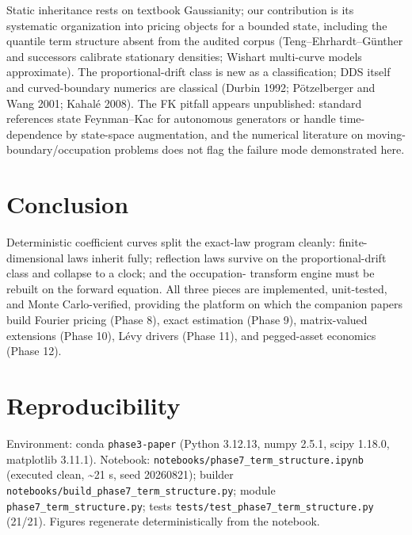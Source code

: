 \documentclass[
  english,
  10pt,
  letterpaper,
  DIV=11,
  numbers=noendperiod]{scrartcl}
\begin{document}
Static inheritance rests on textbook Gaussianity; our contribution is
its systematic organization into pricing objects for a bounded state,
including the quantile term structure absent from the audited corpus
(Teng--Ehrhardt--Günther and successors calibrate stationary densities;
Wishart multi-curve models approximate). The proportional-drift class is
new as a classification; DDS itself and curved-boundary numerics are
classical (Durbin 1992; Pötzelberger and Wang 2001; Kahalé 2008). The FK
pitfall appears unpublished: standard references state Feynman--Kac for
autonomous generators or handle time-dependence by state-space
augmentation, and the numerical literature on moving-boundary/occupation
problems does not flag the failure mode demonstrated here.

\section{Conclusion}\label{sec-conclusion}

Deterministic coefficient curves split the exact-law program cleanly:
finite-dimensional laws inherit fully; reflection laws survive on the
proportional-drift class and collapse to a clock; and the occupation-
transform engine must be rebuilt on the forward equation. All three
pieces are implemented, unit-tested, and Monte Carlo-verified, providing
the platform on which the companion papers build Fourier pricing (Phase
8), exact estimation (Phase 9), matrix-valued extensions (Phase 10),
Lévy drivers (Phase 11), and pegged-asset economics (Phase 12).

\section{Reproducibility}\label{sec-repro}

Environment: conda \texttt{phase3-paper} (Python 3.12.13, numpy 2.5.1,
scipy 1.18.0, matplotlib 3.11.1). Notebook:
\texttt{notebooks/phase7\_term\_structure.ipynb} (executed clean,
\textasciitilde21 s, seed 20260821); builder
\texttt{notebooks/build\_phase7\_term\_structure.py}; module
\texttt{phase7\_term\_structure.py}; tests
\texttt{tests/test\_phase7\_term\_structure.py} (21/21). Figures
regenerate deterministically from the notebook.
\end{document}
